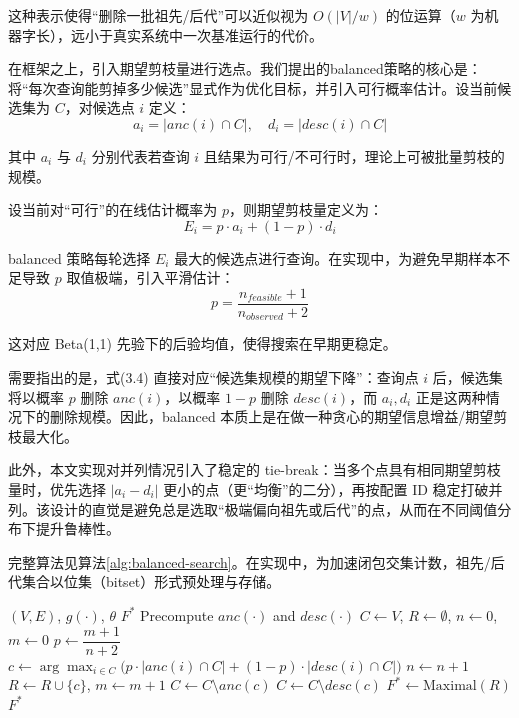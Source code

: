 \documentclass[UTF8,a4paper,12pt,twoside]{ctexart}  %
\begin{document}
这种表示使得``删除一批祖先/后代''可以近似视为 \(O(|V|/w)\)
的位运算（\(w\) 为机器字长），远小于真实系统中一次基准运行的代价。

在框架之上，引入期望剪枝量进行选点。我们提出的balanced策略的核心是：将``每次查询能剪掉多少候选''显式作为优化目标，并引入可行概率估计。设当前候选集为
\(C\)，对候选点 \(i\) 定义：
\begin{equation}
a_i = |anc(i) \cap C|,\quad d_i = |desc(i) \cap C|
\end{equation}

其中 \(a_i\) 与 \(d_i\) 分别代表若查询 \(i\)
且结果为可行/不可行时，理论上可被批量剪枝的规模。

设当前对``可行''的在线估计概率为 \(p\)，则期望剪枝量定义为：
\begin{equation}
E_i = p\cdot a_i + (1-p)\cdot d_i
\end{equation}

balanced 策略每轮选择 \(E_i\)
最大的候选点进行查询。在实现中，为避免早期样本不足导致 \(p\)
取值极端，引入平滑估计：
\begin{equation}
p = \frac{n_{feasible}+1}{n_{observed}+2}
\end{equation}

这对应 Beta(1,1) 先验下的后验均值，使得搜索在早期更稳定。

需要指出的是，式(3.4) 直接对应``候选集规模的期望下降''：查询点 \(i\)
后，候选集将以概率 \(p\) 删除 \(anc(i)\)，以概率 \(1-p\) 删除
\(desc(i)\)，而 \(a_i,d_i\) 正是这两种情况下的删除规模。因此，balanced
本质上是在做一种贪心的期望信息增益/期望剪枝最大化。

此外，本文实现对并列情况引入了稳定的
tie-break：当多个点具有相同期望剪枝量时，优先选择 \(|a_i-d_i|\)
更小的点（更``均衡''的二分），再按配置 ID
稳定打破并列。该设计的直觉是避免总是选取``极端偏向祖先或后代''的点，从而在不同阈值分布下提升鲁棒性。

完整算法见算法\ref{alg:balanced-search}。在实现中，为加速闭包交集计数，祖先/后代集合以位集（bitset）形式预处理与存储。


\begin{algorithm}[htbp]
\caption{Balanced Search on Poset}
\label{alg:balanced-search}
\begin{algorithmic}[1]
\Require $(V,E)$, $g(\cdot)$, $\theta$
\Ensure $F^*$
\State Precompute $anc(\cdot)$ and $desc(\cdot)$
\State $C \gets V$, $R \gets \emptyset$, $n \gets 0$, $m \gets 0$
  \State $p \gets \dfrac{m+1}{n+2}$
  \State $c \gets \arg\max_{i\in C}\big(p\cdot |anc(i)\cap C| + (1-p)\cdot |desc(i)\cap C|\big)$
  \State $n \gets n+1$
    \State $R \gets R \cup \{c\}$, $m \gets m+1$
    \State $C \gets C \setminus anc(c)$
  \Else
    \State $C \gets C \setminus desc(c)$
  \EndIf
\EndWhile
\State $F^* \gets \text{Maximal}(R)$
\State \Return $F^*$
\end{algorithmic}
\end{algorithm}
\end{document}
